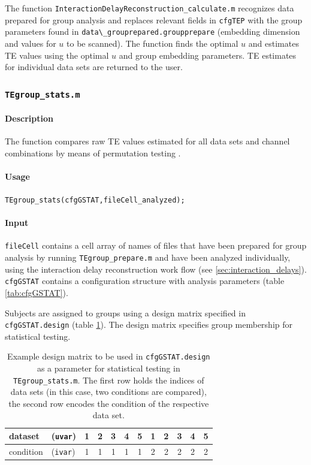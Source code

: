 \documentclass[a4paper,10pt]{article}
\begin{document}
The function \verb&InteractionDelayReconstruction_calculate.m& recognizes data prepared for group analysis and replaces relevant fields in \verb&cfgTEP& with the group parameters found in \verb&data\_grouprepared.groupprepare& (embedding dimension and values for $u$ to be scanned). The function finds the optimal $u$ and estimates TE values using the optimal $u$ and group embedding parameters. TE estimates for individual data sets are returned to the user. 

\subsubsection{\texttt{TEgroup\_stats.m}}

\paragraph*{Description} The function compares raw TE values estimated for all data sets and channel combinations by means of permutation testing \cite{maris2007,lindner2011}. 

\paragraph*{Usage} \verb&TEgroup_stats(cfgGSTAT,fileCell_analyzed);& 

\paragraph*{Input} \verb&fileCell& contains a cell array of names of files that have been prepared for group analysis by running \texttt{TEgroup\_prepare.m} and have been analyzed individually, using the interaction delay reconstruction work flow (see \ref{sec:interaction_delays}). \verb&cfgGSTAT& contains a configuration structure with analysis parameters (table \ref{tab:cfgGSTAT}).

Subjects are assigned to groups using a design matrix specified in \texttt{cfgGSTAT.design} (table \ref{tab:ex_designmatrix}). The design matrix specifies group membership for statistical testing.

\begin{table}[H]
\small \centering
\caption[Example design matrix]{Example design matrix to be used in \texttt{cfgGSTAT.design} as a parameter for statistical testing in \texttt{TEgroup\_stats.m}. The first row holds the indices of data sets (in this case, two conditions are compared), the second row encodes the condition of the respective data set.} 
\begin{tabular}{|ll|cccccccccc|}  \hline
 dataset   & (\verb+uvar+) & 1 & 2 & 3 & 4 & 5 & 1 & 2 & 3 & 4 & 5 \\ \hline
 condition & (\verb+ivar+) & 1 & 1 & 1 & 1 & 1 & 2 & 2 & 2 & 2 & 2 \\ \hline
\end{tabular}\label{tab:ex_designmatrix}
\end{table}
\end{document}
